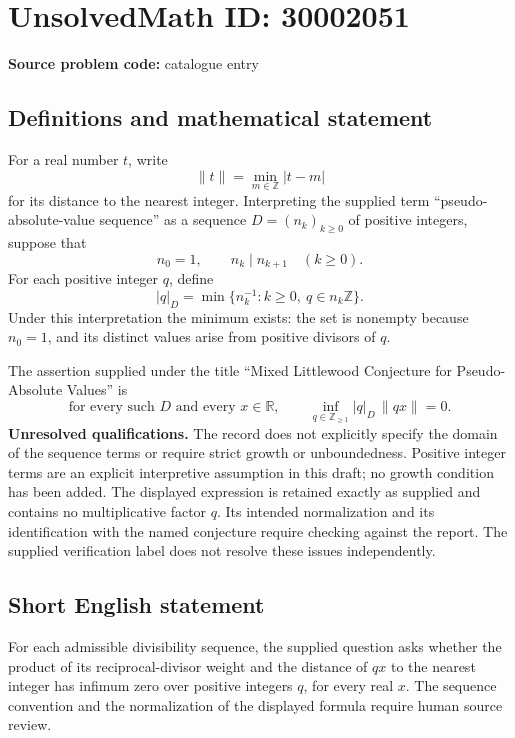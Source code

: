 \documentclass[11pt]{article}
\newcommand{\Z}{\mathbb{Z}}
\newcommand{\R}{\mathbb{R}}
\begin{document}
\section*{UnsolvedMath ID: 30002051}
\textbf{Source problem code:} catalogue entry
\subsection{Definitions and mathematical statement}
For a real number \(t\), write
\[
\lVert t\rVert=\min_{m\in\Z}|t-m|
\]
for its distance to the nearest integer. Interpreting the supplied term ``pseudo-absolute-value sequence'' as a sequence \(D=(n_k)_{k\geq0}\) of positive integers, suppose that
\[
n_0=1,\qquad n_k\mid n_{k+1}\quad(k\geq0).
\]
For each positive integer \(q\), define
\[
|q|_D=\min\bigl\{n_k^{-1}:k\geq0,\ q\in n_k\Z\bigr\}.
\]
Under this interpretation the minimum exists: the set is nonempty because \(n_0=1\), and its distinct values arise from positive divisors of \(q\).

The assertion supplied under the title ``Mixed Littlewood Conjecture for Pseudo-Absolute Values'' is
\[
\text{for every such }D\text{ and every }x\in\R,
\qquad
\inf_{q\in\Z_{\geq1}} |q|_D\,\lVert qx\rVert=0.
\]
\textbf{Unresolved qualifications.} The record does not explicitly specify the domain of the sequence terms or require strict growth or unboundedness. Positive integer terms are an explicit interpretive assumption in this draft; no growth condition has been added. The displayed expression is retained exactly as supplied and contains no multiplicative factor \(q\). Its intended normalization and its identification with the named conjecture require checking against the report. The supplied verification label does not resolve these issues independently.
\subsection{Short English statement}
For each admissible divisibility sequence, the supplied question asks whether the product of its reciprocal-divisor weight and the distance of \(qx\) to the nearest integer has infimum zero over positive integers \(q\), for every real \(x\). The sequence convention and the normalization of the displayed formula require human source review.
\end{document}
